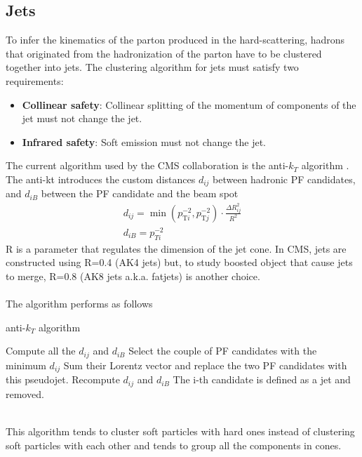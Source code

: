 \subsection{Jets}\label{sec:jets}
To infer the kinematics of the parton produced in the hard-scattering, hadrons that originated from the hadronization of the parton have to be clustered together into jets.
The clustering algorithm for jets must satisfy two requirements:
\begin{itemize}
    \item \textbf{Collinear safety}: Collinear splitting of the momentum of components of the jet must not change the jet.
    \item \textbf{Infrared safety}: Soft emission must not change the jet.
\end{itemize}
The current algorithm used by the CMS collaboration is the anti-$k_T$ algorithm \cite{Cacciari2008TheAlgorithm}.\\
The anti-kt introduces the custom distances $d_{ij}$ between hadronic PF candidates, and $d_{iB}$ between the PF candidate and the beam spot 
\begin{gather}
    d_{i j}=\operatorname*{min}\left(p_{\mathrm{T}i}^{-2},p_{\mathrm{T}j}^{-2}\right)\cdot\frac{\Delta R_{i j}^{2}}{R^2}\\
    d_{iB}=p_{Ti}^{-2}
\end{gather}
R is a parameter that regulates the dimension of the jet cone. In CMS, jets are constructed using R=0.4 (AK4 jets) but, to study boosted object that cause jets to merge, R=0.8 (AK8 jets a.k.a. fatjets) is another choice.\\
\\
The algorithm performs as follows
\begin{algorithm}
\caption{anti-$k_T$ algorithm}\label{algo:akt}
\begin{algorithmic}[1]
    \State Compute all the $d_{ij}$ and $d_{iB}$
        \State Select the couple of PF candidates with the minimum $d_{ij}$
        \State Sum their Lorentz vector and replace the two PF candidates with this pseudojet.
        \State Recompute $d_{ij}$ and $d_{iB}$
            \State The i-th candidate is defined as a jet and removed.
        \EndIf
    \EndWhile
\end{algorithmic}
\end{algorithm}
\\
This algorithm tends to cluster soft particles with hard ones instead of clustering soft particles with each other and tends to group all the components in cones.\\

